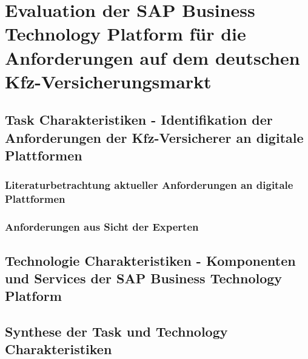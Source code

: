 \chapter{Evaluation der SAP Business Technology Platform für die Anforderungen auf dem deutschen Kfz-Versicherungsmarkt}

\section{Task Charakteristiken - Identifikation der Anforderungen der Kfz-Versicherer an digitale Plattformen}

\subsection{Literaturbetrachtung aktueller Anforderungen an digitale Plattformen}

\subsection{Anforderungen aus Sicht der Experten}

\section{Technologie Charakteristiken - Komponenten und Services der SAP Business Technology Platform}

\section{Synthese der Task und Technology Charakteristiken}


